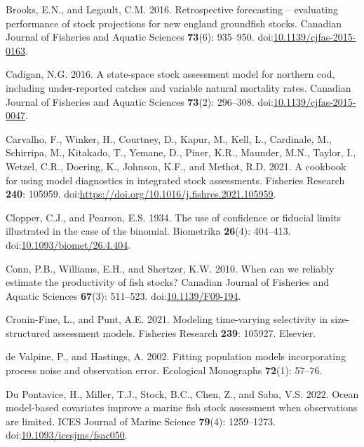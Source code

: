 \documentclass[
  12pt,
]{article}
\newlength{\cslhangindent}
\newlength{\cslentryspacingunit} %
\newenvironment{CSLReferences}[2] %
 {%
  \setlength{\parindent}{0pt}
  \ifodd #1
  \let\oldpar\par
  \def\par{\hangindent=\cslhangindent\oldpar}
  \fi
  \setlength{\parskip}{#2\cslentryspacingunit}
 }%
 {}
\begin{document}
\begin{CSLReferences}{1}{0}
\leavevmode{}%
Brooks, E.N., and Legault, C.M. 2016. Retrospective forecasting --
evaluating performance of stock projections for new england groundfish
stocks. Canadian Journal of Fisheries and Aquatic Sciences
\textbf{73}(6): 935--950.
doi:\href{https://doi.org/10.1139/cjfas-2015-0163}{10.1139/cjfas-2015-0163}.

\leavevmode{}%
Cadigan, N.G. 2016. A state-space stock assessment model for northern
cod, including under-reported catches and variable natural mortality
rates. Canadian Journal of Fisheries and Aquatic Sciences
\textbf{73}(2): 296--308.
doi:\href{https://doi.org/10.1139/cjfas-2015-0047}{10.1139/cjfas-2015-0047}.

\leavevmode{}%
Carvalho, F., Winker, H., Courtney, D., Kapur, M., Kell, L., Cardinale,
M., Schirripa, M., Kitakado, T., Yemane, D., Piner, K.R., Maunder, M.N.,
Taylor, I., Wetzel, C.R., Doering, K., Johnson, K.F., and Methot, R.D.
2021. A cookbook for using model diagnostics in integrated stock
assessments. Fisheries Research \textbf{240}: 105959.
doi:\url{https://doi.org/10.1016/j.fishres.2021.105959}.

\leavevmode{}%
Clopper, C.J., and Pearson, E.S. 1934. The use of confidence or fiducial
limits illustrated in the case of the binomial. Biometrika
\textbf{26}(4): 404--413.
doi:\href{https://doi.org/10.1093/biomet/26.4.404}{10.1093/biomet/26.4.404}.

\leavevmode{}%
Conn, P.B., Williams, E.H., and Shertzer, K.W. 2010. When can we
reliably estimate the productivity of fish stocks? Canadian Journal of
Fisheries and Aquatic Sciences \textbf{67}(3): 511--523.
doi:\href{https://doi.org/10.1139/F09-194}{10.1139/F09-194}.

\leavevmode{}%
Cronin-Fine, L., and Punt, A.E. 2021. Modeling time-varying selectivity
in size-structured assessment models. Fisheries Research \textbf{239}:
105927. Elsevier.

\leavevmode{}%
de Valpine, P., and Hastings, A. 2002. Fitting population models
incorporating process noise and observation error. Ecological Monographs
\textbf{72}(1): 57--76.

\leavevmode{}%
Du Pontavice, H., Miller, T.J., Stock, B.C., Chen, Z., and Saba, V.S.
2022. Ocean model-based covariates improve a marine fish stock
assessment when observations are limited. ICES Journal of Marine Science
\textbf{79}(4): 1259--1273.
doi:\href{https://doi.org/10.1093/icesjms/fsac050}{10.1093/icesjms/fsac050}.


\end{CSLReferences}
\end{document}
